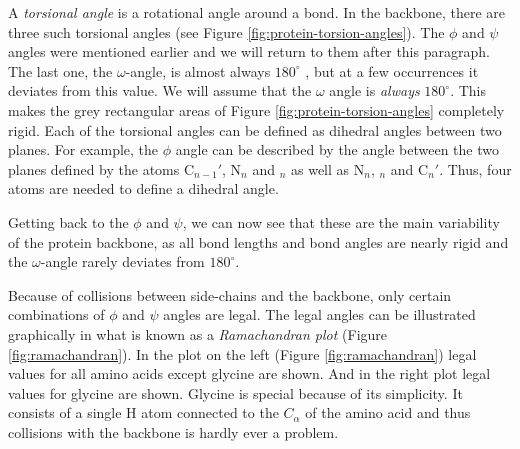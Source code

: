 A \textit{torsional angle} is a rotational angle around a bond. In the
backbone, there are three such torsional angles (see Figure
\ref{fig:protein-torsion-angles}). The $\phi$ and $\psi$ angles were
mentioned earlier and we will return to them after this paragraph. The
last one, the $\omega$-angle, is almost always $180^{\circ}$
\cite{probik}, but at a few occurrences it deviates from this
value. We will assume that the $\omega$ angle is \textit{always}
$180^{\circ}$. This makes the grey rectangular areas of Figure
\ref{fig:protein-torsion-angles} completely rigid.  Each of the
torsional angles can be defined as dihedral angles between two
planes. For example, the $\phi$ angle can be described by the angle
between the two planes defined by the atoms C$_{n-1}'$, N$_n$ and \Ca
$_n$ as well as N$_n$, \Ca $_n$ and C$_n'$. Thus, four atoms are
needed to define a dihedral angle.

Getting back to the $\phi$ and $\psi$, we can now see that these are
the main variability of the protein backbone, as all bond lengths and
bond angles are nearly rigid and the $\omega$-angle rarely
deviates from $180^\circ$. 

Because of collisions between side-chains and the backbone, only
certain combinations of $\phi$ and $\psi$ angles are legal. The legal
angles can be illustrated graphically in what is known as a
\textit{Ramachandran plot} (Figure \ref{fig:ramachandran}). In the
plot on the left (Figure \ref{fig:ramachandran}) legal values for all
amino acids except glycine are shown. And in the right plot legal
values for glycine are shown. Glycine is special because of its
simplicity. It consists of a single H atom connected to the $C_\alpha$
of the amino acid and thus collisions with the backbone is hardly ever
a problem.

